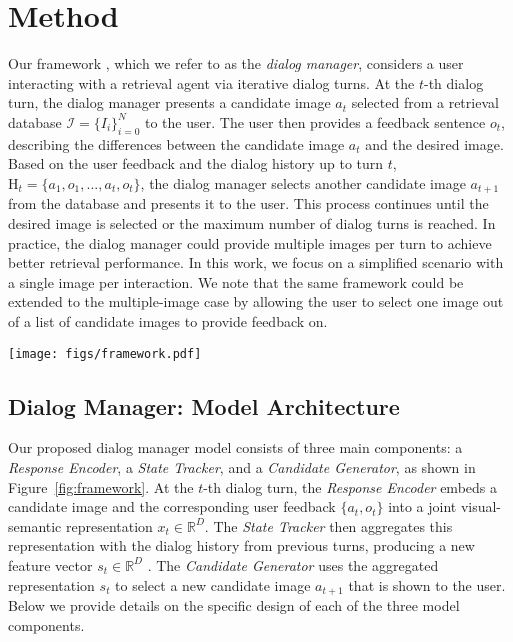 
\section{Method}

Our framework
, which we refer to as the {\em dialog manager}, 
considers a user interacting with a retrieval agent via iterative dialog turns. 
At the $t$-th dialog turn, the dialog manager presents a candidate image $a_{t}$ selected from a retrieval database $ \mathcal{I} = \{I_i\}_{i=0}^{N}$ to the user. The user then provides a feedback sentence $o_{t}$, describing the differences between the candidate image $a_{t}$ and the desired image. Based on the user feedback and the dialog history up to turn $t$, $\mathrm{H}_{t}= \{a_{1},o_{1},...,a_{t},o_{t} \}$, the dialog manager selects another candidate image $a_{t+1}$ from the database and presents it to the user. This process continues until the desired image is selected or the maximum number of dialog turns is reached. 
In practice, the dialog manager
could provide multiple images per turn to achieve better retrieval
performance. In this work, we focus on a simplified scenario with a single image 
per interaction. We
note that the same framework could be extended to
the multiple-image case by allowing the user to select one
image out of a list of candidate images to provide feedback on.

\begin{figure*}[t!]
\begin{center}
\texttt{[image: figs/framework.pdf]}
\end{center}
\caption{The proposed end-to-end framework for dialog-based interactive image retrieval. }
\label{fig:framework}
\end{figure*}

\subsection{Dialog Manager: Model Architecture}
\label{sec:framework}
Our proposed dialog manager model consists of three main components: a {\em Response Encoder}, a {\em State Tracker}, and a {\em Candidate Generator}, as shown in Figure~\ref{fig:framework}. At the $t$-th dialog turn, the {\em Response Encoder} embeds a candidate image and the corresponding user feedback $\{a_t, o_t\}$ into a joint visual-semantic representation $x_t \in \mathbb{R}^D$. The {\em State Tracker} then aggregates this representation with the dialog history from previous turns, producing a new feature vector $s_t \in \mathbb{R}^D$ . The {\em Candidate Generator} uses the aggregated representation $s_t$ to select a new candidate image $a_{t+1}$ that is shown to the user. Below we provide details on the specific design of each of the three model components.

